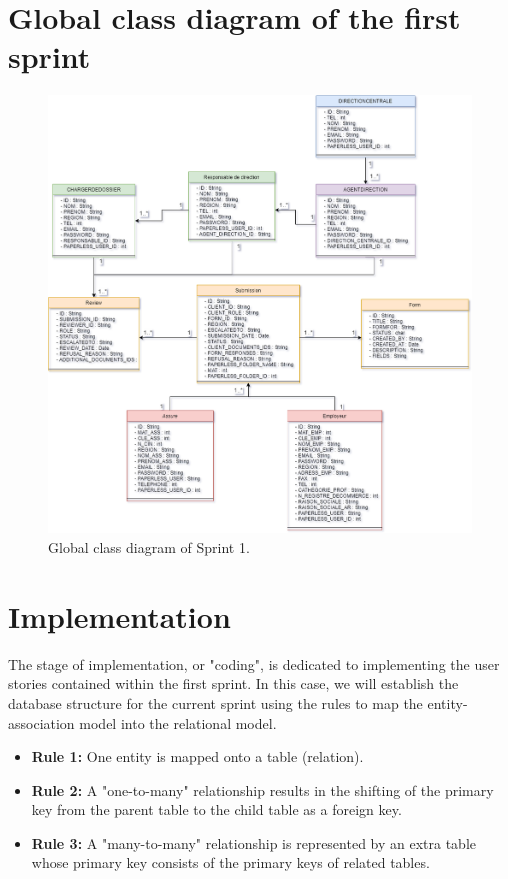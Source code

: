 \section{Global class diagram of the first sprint}
\begin{figure}[h!]
    \centering
    \includegraphics[width=1\textwidth]{figures/global_class_diagram_sprint_1-diagram_de_classe_sprint_1.png}
    \caption{Global class diagram of Sprint 1.}
\end{figure}
\clearpage
\section{Implementation}
The stage of implementation, or "coding", is dedicated to implementing the user stories contained within the first sprint.
In this case, we will establish the database structure for the current sprint using the rules to map the entity-association model into the relational model.
\begin{itemize}
    \item \textbf{Rule 1:} One entity is mapped onto a table (relation).
    \item \textbf{Rule 2:} A "one-to-many" relationship results in the shifting of the primary key from the parent table to the child table as a foreign key.
    \item \textbf{Rule 3:} A "many-to-many" relationship is represented by an extra table whose primary key consists of the primary keys of related tables.
\end{itemize}

